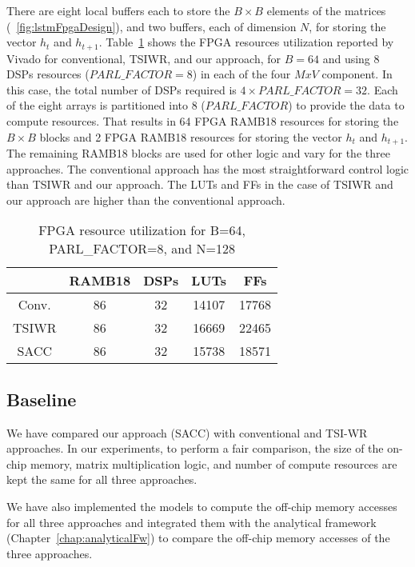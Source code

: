 {There are eight local buffers each to store the $B{\times}B$ elements of the matrices (\figurename{~\ref{fig:lstmFpgaDesign}}), and two buffers, each of dimension $N$, for storing the vector $h_t$ and $h_{t{+}1}$. Table~\ref{tab:fpgaResources} shows the FPGA resources utilization reported by Vivado for conventional, TSIWR, and our approach, for $B{=}64$ and using 8 DSPs resources ($PARL\_FACTOR{=}8$) in each of the four $MxV$ component. In this case, the total number of DSPs required is $4{\times}PARL\_FACTOR{=}32$.
Each of the eight arrays is partitioned into 8 ($PARL\_FACTOR$) to provide the data to compute resources. That results in 64 FPGA RAMB18 resources for storing the $B{\times}B$ blocks and 2 FPGA RAMB18 resources for storing the vector $h_t$ and $h_{t{+}1}$. The remaining RAMB18 blocks are used for other logic and vary for the three approaches. The conventional approach has the most straightforward control logic than TSIWR and our approach. The LUTs and FFs in the case of TSIWR and our approach are higher than the conventional approach. 
\begin{table}[htb]
	\centering
	\caption{FPGA resource utilization for B=64, PARL\_FACTOR=8, and N=128 }
	\label{tab:fpgaResources}
	\begin{tabular}{ccccc}
		\hline
		& RAMB18 & DSPs & LUTs  & FFs   \\ \hline
		Conv. & 86     & 32   & 14107 & 17768 \\ \hline
		TSIWR & 86     & 32   & 16669 & 22465 \\ \hline
		SACC  & 86     & 32   & 15738 & 18571 \\ \hline
	\end{tabular}
\end{table}
\subsection{Baseline}
We have compared our approach (SACC) with conventional and TSI-WR~\cite{park2020time} approaches. In our experiments, to perform a fair comparison, the size of the on-chip memory, matrix multiplication logic, and number of compute resources are kept the same for all three approaches.

We have also implemented the models to compute the off-chip memory accesses for all three approaches and integrated them with the analytical framework (Chapter~\ref{chap:analyticalFw}) to compare the off-chip memory accesses of the three approaches.
}
